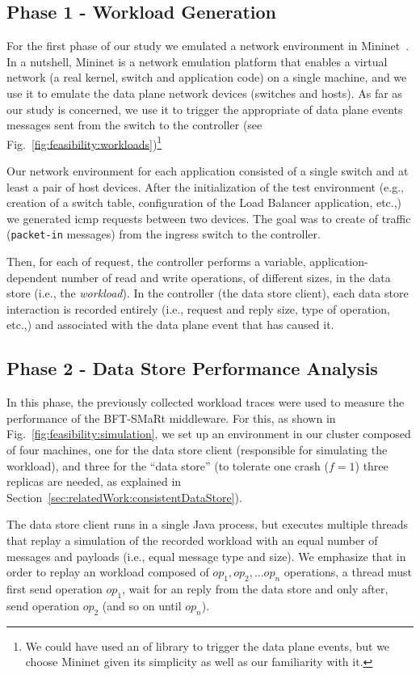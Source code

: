 \subsection{Phase 1 - Workload Generation}
For the first phase of our study we emulated a network environment in Mininet~\cite{Handigol:2012tg}. 
In a nutshell, Mininet is a network emulation platform that enables a virtual network (a real kernel, switch and application code) on a single machine, and we use it to emulate the data plane network devices (switches and hosts). 
As far as our study is concerned, we use it to trigger the appropriate \gls{of} data plane events messages sent from the switch to the controller (see Fig.~\ref{fig:feasibility:workloads})\footnote{We could have used an \gls{of} library to trigger the data plane events, but we choose Mininet given its simplicity as well as our familiarity with it.} 

Our network environment for each application consisted  of a single switch and at least a pair of host devices.
After the initialization of the test environment (e.g., creation of a switch table, configuration of the Load Balancer application, etc.,) we  generated \gls{icmp} requests between two devices. 
The goal was to create \gls{of}  traffic (\texttt{packet-in} messages) from the ingress switch to the controller. 

Then, for each \gls{of} request, the controller performs a variable, application-dependent number of read and write operations, of different sizes, in the data store (i.e., the \textit{workload}). 
In the controller (the data store client),  each data store interaction is recorded entirely (i.e., request and reply size, type of operation, etc.,) and associated with the data plane event that has caused it. 

\subsection{Phase 2 - Data Store Performance Analysis}
In this phase, the previously collected workload traces were used to measure the performance of the BFT-SMaRt middleware. 
For this, as shown in Fig.~\ref{fig:feasibility:simulation}, we set up an environment in our cluster composed of four machines, one for the data store client (responsible for simulating the workload), and three for the ``data store'' (to tolerate one crash ($f=1$) three replicas are needed, as explained in Section~\ref{sec:relatedWork:consistentDataStore}). 

The data store client runs in a single Java process, but executes multiple threads that replay a simulation of the recorded workload with an equal number of messages and payloads (i.e., equal message type and size). 
We emphasize  that in order to replay an workload composed of $op_1,op_2,...op_n$ operations, a thread must first send operation $op_1$, wait for an reply from the data store and only after, send operation $op_2$ (and so on until $op_n$). 

